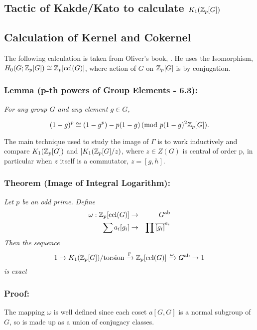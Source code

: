 \subsection{Tactic of Kakde/Kato to calculate $K_1(\mathbb Z_p[G])$}

\subsection{Calculation of Kernel and Cokernel}
The following calculation is taken from Oliver's book, \cite{oliverwhitehead}. He uses the Isomorphism, $H_0(G;\mathbb Z_p[G])\cong \mathbb Z_p [\text{ccl(} G)]$, where action of $G$ on $\mathbb Z_p [G]$ is by conjugation.

\subsubsection*{Lemma (p-th powers of Group Elements - \cite{oliverwhitehead} 6.3):}

\emph{For any group $G$ and any element $g\in G$,}

$$(1-g)^p \cong (1-g^p) - p (1-g) \, (\text{mod } p(1-g)^2\mathbb Z_p[G]).$$

The main technique used to study the image of $\Gamma$ is to work inductively and compare $K_1(\mathbb Z_p[G])$ and $[K_1(\mathbb Z_p[G]/z)$, where $z\in Z(G)$  is central of order p, in particular when $z$ itself is a commutator, $z=[g,h]$.

\subsubsection*{Theorem (Image of Integral Logarithm):}
\emph{Let $p$ be an odd prime. Define
\begin{eqnarray}
\nonumber 	\omega: \mathbb Z_p [ \text{ccl(} G) ]   	&\rightarrow&		G^{\text{ab}}\\
\nonumber   	\sum a_i [g_i] 			&\rightarrow& 		\prod {\overline{[g_i]}}^{a_i}
\end{eqnarray}
Then the sequence 
 $$1\rightarrow K_1(\mathbb Z_p[G])/ \text{torsion} \xrightarrow{\Gamma}  \mathbb Z_p [\text{ccl(} G)] \xrightarrow{\omega} G^{\text{ab}} \rightarrow 1$$
is exact}

\subsubsection*{Proof:}
The mapping $\omega$ is well defined since each coset $a[G,G]$ is a normal subgroup of $G$, so is made up as a union of conjugacy classes.

